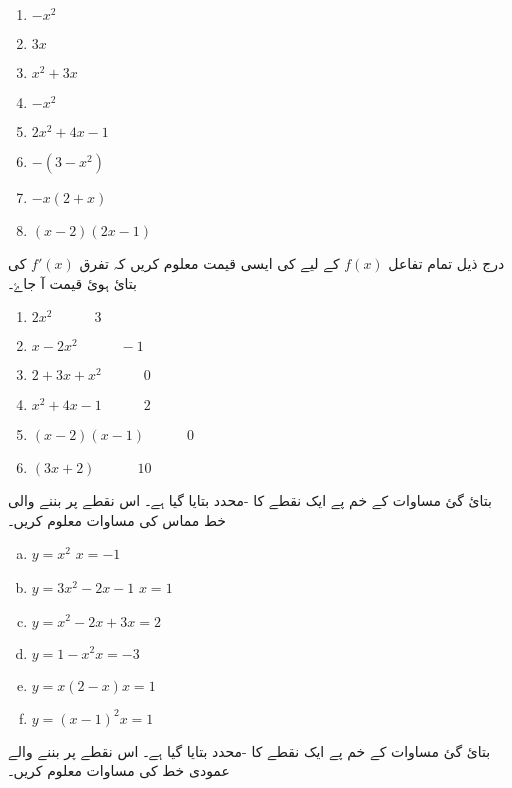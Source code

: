 \begin{multicols}{4}    
\begin{enumerate}[.a]
\item \(-x^{2}\)
\item \(3x\)
\item \(x^{2} + 3x\)
\item \(-x^{2}\)
\item \(2x^{2} + 4x -1\)
\item \(-(3-x^{2} )\)
\item \(-x(2+x)\)
\item \((x-2)(2x-1)\)
\end{enumerate}
 \end{multicols}
درج ذیل تمام تفاعل  \(f(x)\) کے لیے   کی ایسی قیمت معلوم کریں کہ تفرق \(f'(x)\) کی بتائ ہوئ قیمت آ جاۓ۔
\begin{multicols}{4}   
\begin{enumerate}[.a]
\item \(2x^{2} \quad \quad \quad 3\)
\item \(x-2x^{2} \quad \quad \quad -1\)
 \item \(2+3x+x^{2} \quad \quad \quad 0\)
\item \(x^{2} +4x -1 \quad \quad \quad 2\)
\item \((x-2)(x-1) \quad \quad \quad 0\)
\item \((3x+2) \quad \quad \quad 10\)
\end{enumerate}
 \end{multicols}
بتائ گئ مساوات کے خم پے ایک نقطے کا -محدد بتایا گیا ہے۔ اس نقطے پر بننے والی خط مماس کی مساوات معلوم کریں۔
\begin{multicols}{2}  
\begin{enumerate}[a.]
\item \(y=x^{2}\) \quad\quad \(x= -1\)
\item \(y=3x^{2} -2x -1 \) \quad\quad \(x=1\)
\item \(y=x^{2} -2x +3 \)\quad\quad \(x=2\)
\item \(y=1-x^{2}\)\quad\quad \(x=-3\)
\item \(y=x(2-x)\)\quad\quad  \(x=1\)
\item\(y=(x-1)^{2}\)\quad\quad \(x=1\)
\end{enumerate}
 \end{multicols}
بتائ گئ مساوات کے خم پے ایک نقطے کا -محدد بتایا گیا ہے۔ اس نقطے پر بننے والے عمودی خط  کی مساوات معلوم کریں۔
